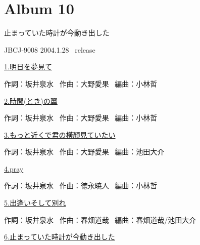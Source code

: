 
\chapter{Album 10}
\thispagestyle{empty} %
\vspace{-16mm}
\LARGE {止まっていた時計が今動き出した}

\normalsize{JBCJ-9008 2004.1.28 \ release}
\\

\vspace{-5mm}


\small{\hyperlink{10_0}{1.明日を夢見て}}

\tiny{作詞：坂井泉水 \ 作曲：大野愛果 \ 編曲：小林哲}

\small{\hyperlink{10_1}{2.時間(とき)の翼}}

\tiny{作詞：坂井泉水 \ 作曲：大野愛果 \ 編曲：小林哲}

\small{\hyperlink{10_2}{3.もっと近くで君の橫顏見ていたい}}

\tiny{作詞：坂井泉水 \ 作曲：大野愛果 \ 編曲：池田大介}

\small{\hyperlink{10_3}{4.pray}}

\tiny{作詞：坂井泉水 \ 作曲：徳永暁人 \ 編曲：小林哲}

\small{\hyperlink{10_4}{5.出逢いそして別れ}}

\tiny{作詞：坂井泉水 \ 作曲：春畑道哉 \ 編曲：春畑道哉/池田大介}

\small{\hyperlink{10_5}{6.止まっていた時計が今動き出した}}


